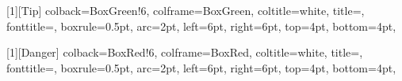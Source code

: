[1][Tip]{
    colback=BoxGreen!6, colframe=BoxGreen, coltitle=white,
    title={\vphantom{N}}, fonttitle=\sffamily,
    boxrule=0.5pt, arc=2pt,
    left=6pt, right=6pt, top=4pt, bottom=4pt,
}

[1][Danger]{
    colback=BoxRed!6, colframe=BoxRed, coltitle=white,
    title={\vphantom{N}}, fonttitle=\sffamily,
    boxrule=0.5pt, arc=2pt,
    left=6pt, right=6pt, top=4pt, bottom=4pt,
}


\newtheorem{theorem}{Theorem}[section]
\newtheorem{definition}{Definition}[section]
\newtheorem{lemma}{Lemma}[section]
\newtheorem{corollary}{Corollary}[section]
\newtheorem{proposition}{Proposition}[section]



\newcommand{\todox}[1]{\todo[inline, color=yellow!40]{#1}}

\newcommand{\todomark}[1]{%
    $\square$~{#1}%
}
\newcommand{\tododone}[1]{%
    $\boxtimes$~{\sout{#1}}%
}


\newenvironment{twocol}{%
    \begin{multicols}{2}%
}{%
    \end{multicols}%
}

\newenvironment{threecol}{%
    \begin{multicols}{3}%
}{%
    \end{multicols}%
}



